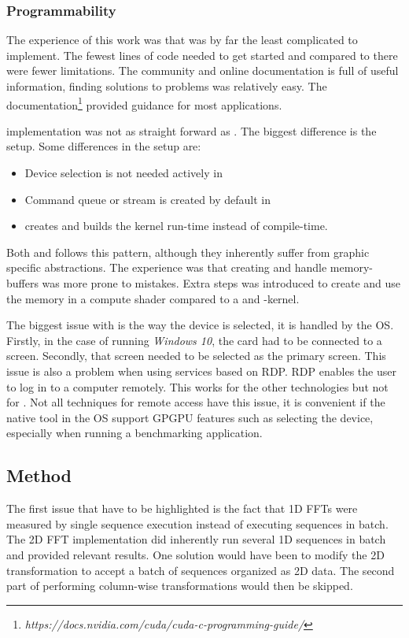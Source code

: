 \subsubsection{Programmability}

The experience of this work was that {\CU} was by far the least complicated to implement. The fewest lines of code needed to get started and compared to {\CPP} there were fewer limitations. The {\CU} community and online documentation is full of useful information, finding solutions to problems was relatively easy. The documentation\footnote{\textit{https://docs.nvidia.com/cuda/cuda-c-programming-guide/}} provided guidance for most applications.

{\OCL} implementation was not as straight forward as {\CU}. The biggest difference is the setup. Some differences in the setup are:
\begin{itemize}
	\item Device selection is not needed actively in {\CU}
	\item Command queue or stream is created by default in {\CU}
	\item {\CU} creates and builds the \gls{kernel} run-time instead of compile-time.
\end{itemize}
Both {\DX} and {\GL} follows this pattern, although they inherently suffer from graphic specific abstractions. The experience was that creating and handle memory-buffers was more prone to mistakes. Extra steps was introduced to create and use the memory in a compute shader compared to a {\CU} and {\OCL}-kernel.

The biggest issue with {\GL} is the way the device is selected, it is handled by the \gls{OS}. Firstly, in the case of running \emph{Windows 10}, the card had to be connected to a screen. Secondly, that screen needed to be selected as the primary screen. This issue is also a problem when using services based on \gls{RDP}. \gls{RDP} enables the user to log in to a computer remotely. This works for the other technologies but not for {\GL}. Not all techniques for remote access have this issue, it is convenient if the native tool in the \gls{OS} support \gls{GPGPU} features such as selecting the device, especially when running a benchmarking application.

\subsection{Method}

The first issue that have to be highlighted is the fact that \gls{1D} \gls{FFT}s were measured by single sequence execution instead of executing sequences in batch. The \gls{2D} \gls{FFT} implementation did inherently run several \gls{1D} sequences in batch and provided relevant results. One solution would have been to modify the \gls{2D} transformation to accept a batch of sequences organized as \gls{2D} data. The second part of performing column-wise transformations would then be skipped.

